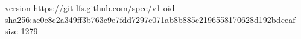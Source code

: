 version https://git-lfs.github.com/spec/v1
oid sha256:ae0e8c2a349ff3b763c9e7fdd7297c071ab8b885c2196558170628d192bdceaf
size 1279
